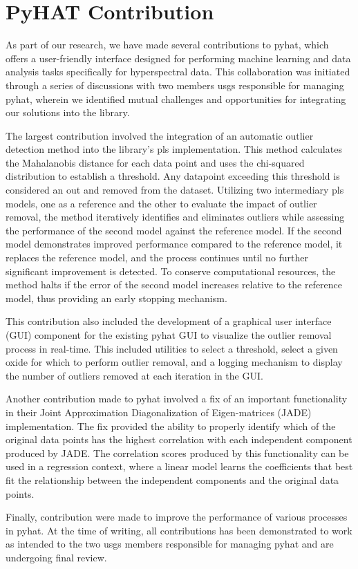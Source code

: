 \section{PyHAT Contribution}\label{sec:pyhat_contribution}
As part of our research, we have made several contributions to \gls{pyhat}, which offers a user-friendly interface designed for performing machine learning and data analysis tasks specifically for hyperspectral data.
This collaboration was initiated through a series of discussions with two members \gls{usgs} responsible for managing \gls{pyhat}, wherein we identified mutual challenges and opportunities for integrating our solutions into the library.

The largest contribution involved the integration of an automatic outlier detection method into the library's \gls{pls} implementation. 
This method calculates the Mahalanobis distance for each data point and uses the chi-squared distribution to establish a threshold.
Any datapoint exceeding this threshold is considered an out and removed from the dataset.
Utilizing two intermediary \gls{pls} models, one as a reference and the other to evaluate the impact of outlier removal, the method iteratively identifies and eliminates outliers while assessing the performance of the second model against the reference model. 
If the second model demonstrates improved performance compared to the reference model, it replaces the reference model, and the process continues until no further significant improvement is detected. 
To conserve computational resources, the method halts if the error of the second model increases relative to the reference model, thus providing an early stopping mechanism.

This contribution also included the development of a graphical user interface (GUI) component for the existing \gls{pyhat} GUI to visualize the outlier removal process in real-time.
This included utilities to select a threshold, select a given oxide for which to perform outlier removal, and a logging mechanism to display the number of outliers removed at each iteration in the GUI.

Another contribution made to \gls{pyhat} involved a fix of an important functionality in their Joint Approximation Diagonalization of Eigen-matrices (JADE) implementation.
The fix provided the ability to properly identify which of the original data points has the highest correlation with each independent component produced by JADE.
The correlation scores produced by this functionality can be used in a regression context, where a linear model learns the coefficients that best fit the relationship between the independent components and the original data points.

Finally, contribution were made to improve the performance of various processes in \gls{pyhat}.
At the time of writing, all contributions has been demonstrated to work as intended to the two \gls{usgs} members responsible for managing \gls{pyhat} and are undergoing final review.

 